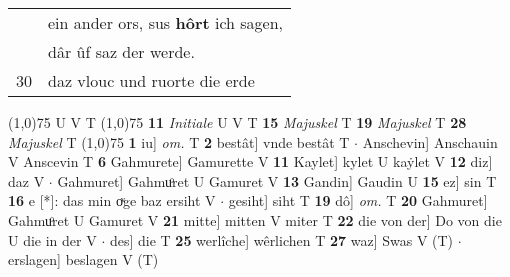 \documentclass[8pt,a4paper,notitlepage]{article}
\begin{document}
\begin{table}[ht]
\begin{minipage}[t]{0.5\linewidth}
\begin{tabular}{rl}
 & ein ander ors, sus \textbf{hôrt} ich sagen,\\ 
 & dâr ûf saz der werde.\\ 
30 & daz vlouc und ruorte die erde\\ 
\end{tabular}
\scriptsize
\line(1,0){75} \newline
U V T \newline
\line(1,0){75} \newline
\textbf{11} \textit{Initiale} U V T  \textbf{15} \textit{Majuskel} T  \textbf{19} \textit{Majuskel} T  \textbf{28} \textit{Majuskel} T  \newline
\line(1,0){75} \newline
\textbf{1} iu] \textit{om.} T \textbf{2} bestât] vnde bestât T  $\cdot$ Anschevin] Anschauin V Anscevin T \textbf{6} Gahmurete] Gamurette V \textbf{11} Kaylet] kylet U kaẏlet V \textbf{12} diz] daz V  $\cdot$ Gahmuret] Gahmuͦret U Gamuret V \textbf{13} Gandin] Gaudin U \textbf{15} ez] sin T \textbf{16} e [*]: das min oͮge baz ersiht V  $\cdot$ gesiht] siht T \textbf{19} dô] \textit{om.} T \textbf{20} Gahmuret] Gahmuͦret U Gamuret V \textbf{21} mitte] mitten V miter T \textbf{22} die von der] Do von die U die in der V  $\cdot$ des] die T \textbf{25} werlîche] wêrlichen T \textbf{27} waz] Swas V (T)  $\cdot$ erslagen] beslagen V (T) \newline
\end{minipage}
\end{table}
\end{document}
